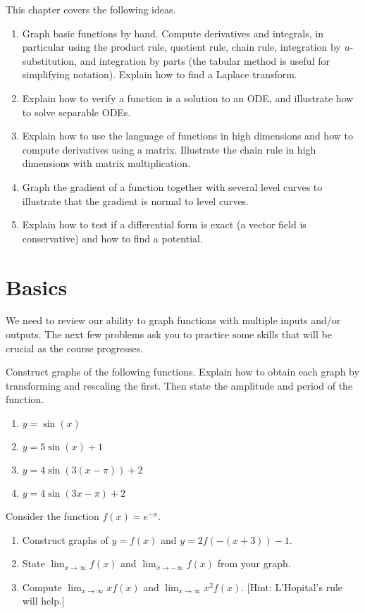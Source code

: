 
\noindent This chapter covers the following ideas.


\begin{enumerate}

\item Graph basic functions by hand. Compute derivatives and integrals, in particular using the product rule, quotient rule, chain rule, integration by $u$-substitution, and integration by parts (the tabular method is useful for simplifying notation). Explain how to find a Laplace transform. 
\item Explain how to verify a function is a solution to an ODE, and illustrate how to solve separable ODEs.
\item Explain how to use the language of functions in high dimensions and how to compute derivatives using a matrix. Illustrate the chain rule in high dimensions with matrix multiplication.
\item Graph the gradient of a function together with several level curves to illustrate that the gradient is normal to level curves.
\item Explain how to test if a differential form is exact (a vector field is conservative) and how to find a potential. 

\end{enumerate}

\section{Basics}
We need to review our ability to graph functions with multiple inputs and/or outputs.  The next few problems ask you to practice some skills that will be crucial as the course progresses.

\begin{problem}
Construct graphs of the following functions. Explain how to obtain each graph by transforming and rescaling the first. Then state the amplitude and period of the function.
\begin{enumerate}
\item $y=\sin(x)$
\item $y=5\sin(x)+1$
\item $y=4\sin(3(x-\pi))+2$
\item $y=4\sin(3x-\pi)+2$
\end{enumerate}
\end{problem}


\begin{problem}
Consider the function $f(x)=e^{-x}$.
\begin{enumerate}
 \item Construct graphs of $y=f(x)$  and $y=2f(-(x+3))-1$.
 \item State $\lim_{x\to \infty} f(x)$ and $\lim_{x\to -\infty} f(x)$ from your graph.
 \item Compute $\lim_{x\to \infty} x f(x)$ and $\lim_{x\to \infty} x^2f(x)$. [Hint: L'Hopital's rule will help.]
\end{enumerate}  
\end{problem}

